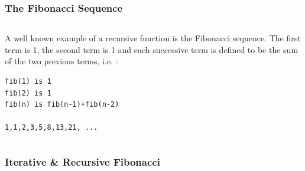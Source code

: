 
\begin{frame}[fragile]
\frametitle{The Fibonacci Sequence}
\begin{columns}[T]


\begin{column}{0.35\textwidth}
A well known example of a recursive function is the Fibonacci
sequence. The first term is 1, the second term is 1 and each
successive term is defined to be the sum of the two previous
terms, i.e. :
\begin{verbatim}
fib(1) is 1
fib(2) is 1
fib(n) is fib(n-1)+fib(n-2)

1,1,2,3,5,8,13,21, ...
\end{verbatim}
\end{column}

\end{columns}
\end{frame}


\begin{frame}[fragile]
\frametitle{Iterative \& Recursive Fibonacci}
\begin{columns}[T]

\begin{column}{0.50\textwidth}

\end{column}

\pause
\begin{column}{0.40\textwidth}
\end{column}

\end{columns}
\end{frame}


